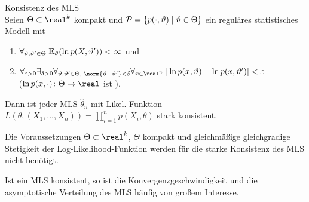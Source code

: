 \begin{Satz}{Konsistenz des MLS}\\
    Seien $\Theta \subset \real^k$ kompakt und $\P = \{p(\cdot, \theta) \;|\; \theta \in \Theta\}$
    ein reguläres statistisches Modell mit
    \begin{enumerate}
        \item
        $\forall_{\theta, \theta' \in \Theta}\; \EE_\theta(\ln p(X, \theta')) < \infty$ und

        \item
        $\forall_{\varepsilon > 0} \exists_{\delta > 0} \forall_{\theta, \theta' \in \Theta,\;
        \norm{\theta - \theta'} < \delta} \forall_{x \in \real^n}\;
        |\ln p(x, \theta) - \ln p(x, \theta')| < \varepsilon$\\
        ($\ln p(x, \cdot)\colon \Theta \rightarrow \real$ ist
        ).
    \end{enumerate}
    Dann ist jeder MLS $\widehat{\theta}_n$ mit Likel.-Funktion
    $L(\theta, (X_1, \dotsc, X_n)) = \prod_{i=1}^n p(X_i, \theta)$
    stark konsistent.
\end{Satz}

\begin{Bem}
    Die Voraussetzungen $\Theta \subset \real^k$, $\Theta$ kompakt und
    gleichmäßige gleichgradige Stetigkeit der Log-Likelihood-Funktion werden für die
    starke Konsistenz des MLS nicht benötigt.
\end{Bem}

\linie

\begin{Bem}
    Ist ein MLS konsistent, so ist die Konvergenzgeschwindigkeit und die asymptotische Verteilung
    des MLS häufig von großem Interesse.
\end{Bem}

